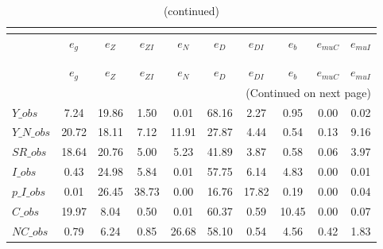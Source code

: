  
\begin{center}
\begin{longtable}{lccccccccc} 
\caption{VARIANCE DECOMPOSITION (in percent)}\\
 \label{Table:th_var_decomp_uncond}\\
\toprule 
$               $	 & 	 $        {e_g}$	 & 	 $        {e_Z}$	 & 	 $     {e_{ZI}}$	 & 	 $        {e_N}$	 & 	 $        {e_D}$	 & 	 $     {e_{DI}}$	 & 	 $        {e_b}$	 & 	 $    {e_{muC}}$	 & 	 $    {e_{muI}}$\\
\midrule \endfirsthead 
\caption{(continued)}\\
 \toprule \\ 
$               $	 & 	 $        {e_g}$	 & 	 $        {e_Z}$	 & 	 $     {e_{ZI}}$	 & 	 $        {e_N}$	 & 	 $        {e_D}$	 & 	 $     {e_{DI}}$	 & 	 $        {e_b}$	 & 	 $    {e_{muC}}$	 & 	 $    {e_{muI}}$\\
\midrule \endhead 
\midrule \multicolumn{10}{r}{(Continued on next page)} \\ \bottomrule \endfoot 
\bottomrule \endlastfoot 
$Y\_obs         $	 & 	         7.24	 & 	        19.86	 & 	         1.50	 & 	         0.01	 & 	        68.16	 & 	         2.27	 & 	         0.95	 & 	         0.00	 & 	         0.02 \\ 
$Y\_N\_obs      $	 & 	        20.72	 & 	        18.11	 & 	         7.12	 & 	        11.91	 & 	        27.87	 & 	         4.44	 & 	         0.54	 & 	         0.13	 & 	         9.16 \\ 
$SR\_obs        $	 & 	        18.64	 & 	        20.76	 & 	         5.00	 & 	         5.23	 & 	        41.89	 & 	         3.87	 & 	         0.58	 & 	         0.06	 & 	         3.97 \\ 
$I\_obs         $	 & 	         0.43	 & 	        24.98	 & 	         5.84	 & 	         0.01	 & 	        57.75	 & 	         6.14	 & 	         4.83	 & 	         0.00	 & 	         0.01 \\ 
$p\_I\_obs      $	 & 	         0.01	 & 	        26.45	 & 	        38.73	 & 	         0.00	 & 	        16.76	 & 	        17.82	 & 	         0.19	 & 	         0.00	 & 	         0.04 \\ 
$C\_obs         $	 & 	        19.97	 & 	         8.04	 & 	         0.50	 & 	         0.01	 & 	        60.37	 & 	         0.59	 & 	        10.45	 & 	         0.00	 & 	         0.07 \\ 
$NC\_obs        $	 & 	         0.79	 & 	         6.24	 & 	         0.85	 & 	        26.68	 & 	        58.10	 & 	         0.54	 & 	         4.56	 & 	         0.42	 & 	         1.83 \\ 

\end{longtable}
\end{center}
